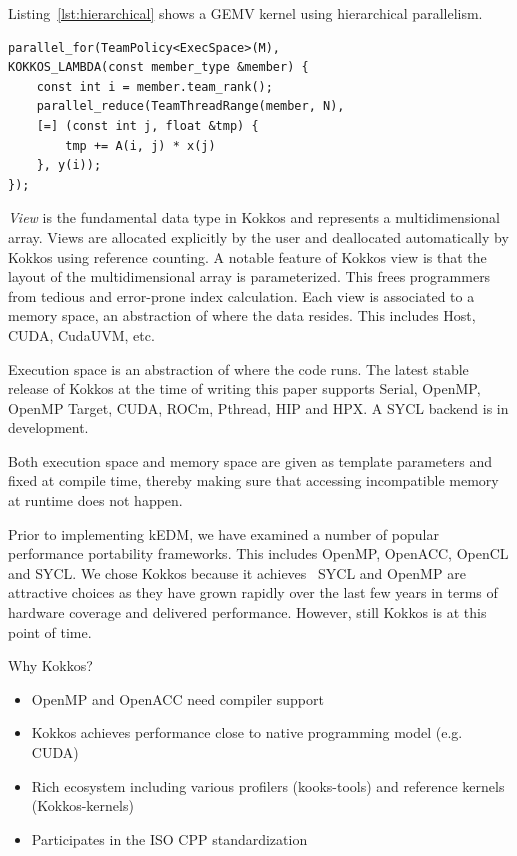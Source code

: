 \documentclass[conference]{IEEEtran}
\begin{document}
Listing~\ref{lst:hierarchical} shows a GEMV kernel using hierarchical
parallelism.

\begin{lstlisting}[caption={Hierarchical data parallel loop},label={lst:hierarchical}]
parallel_for(TeamPolicy<ExecSpace>(M),
KOKKOS_LAMBDA(const member_type &member) {
    const int i = member.team_rank();
    parallel_reduce(TeamThreadRange(member, N),
    [=] (const int j, float &tmp) {
        tmp += A(i, j) * x(j)
    }, y(i));
});
\end{lstlisting}

\textit{View} is the fundamental data type in Kokkos and represents a
multidimensional array. Views are allocated explicitly by the user and
deallocated automatically by Kokkos using reference counting. A notable
feature of Kokkos view is that the layout of the multidimensional array is
parameterized. This frees programmers from tedious and error-prone index
calculation. Each view is associated to a memory space, an abstraction of
where the data resides. This includes Host, CUDA, CudaUVM, etc.

Execution space is an abstraction of where the code runs. The latest stable
release of Kokkos at the time of writing this paper supports Serial, OpenMP,
OpenMP Target, CUDA, ROCm, Pthread, HIP and HPX\@. A SYCL backend is in
development.

Both execution space and memory space are given as template parameters and
fixed at compile time, thereby making sure that accessing incompatible memory
at runtime does not happen.

Prior to implementing kEDM, we have examined a number of popular performance
portability frameworks. This includes OpenMP, OpenACC, OpenCL and SYCL.
We chose Kokkos because it achieves~\cite{Deakin2019}
SYCL and OpenMP are attractive choices as they have grown rapidly over the
last few years in terms of hardware coverage and delivered performance.
However, still Kokkos is at this point of time.

Why Kokkos?
\begin{itemize}
    \item OpenMP and OpenACC need compiler support
    \item Kokkos achieves performance close to native programming model (e.g. CUDA)
    \item Rich ecosystem including various profilers (kooks-tools) and reference kernels  (Kokkos-kernels)
    \item Participates in the ISO CPP standardization
\end{itemize}
\end{document}

